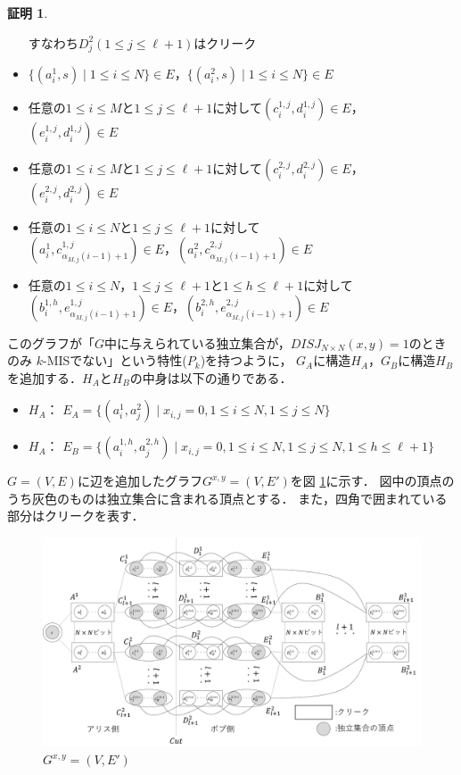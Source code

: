 \documentclass[12pt]{thesis}
\theoremstyle{definition}
\newtheorem*{prf*}{証明}
\begin{document}
\begin{prf*}
\begin{itemize}
すなわち$D^{2}_{j}(1\leq j \leq \ell+1)$はクリーク
\item $\{(a^{1}_{i}, s) \mid 1\leq i \leq N\} \in E$，$\{(a^{2}_{i}, s) \mid 1\leq i \leq N\} \in E$
\item 任意の$1\leq i \leq M$と$1\leq j \leq \ell+1$に対して$(c_{i}^{1, j}, d_{i}^{1, j}) \in E$，
$(e_{i}^{1, j}, d_{i}^{1, j}) \in E$
\item 任意の$1\leq i \leq M$と$1\leq j \leq \ell+1$に対して$(c_{i}^{2, j}, d_{i}^{2, j}) \in E$，
$(e_{i}^{2, j}, d_{i}^{2, j}) \in E$
\item 任意の$1\leq i \leq N$と$1\leq j \leq \ell+1$に対して \\
$\left(a^{1}_{i},c^{1,j}_{\alpha_{M,j}(i-1)+1}\right) \in E$，$\left(a^{2}_{i},c^{2,j}_{\alpha_{M,j}(i-1)+1}\right) \in E$
\item 任意の$1\leq i \leq N$，$1\leq j \leq \ell+1$と$1\leq h \leq \ell+1$に対して \\
$\left(b^{1,h}_{i},e^{1,j}_{\alpha_{M,j}(i-1)+1}\right) \in E$，$\left(b^{2,h}_{i},e^{2,j}_{\alpha_{M,j}(i-1)+1}\right) \in E$
\end{itemize}
このグラフが「$G$中に与えられている独立集合が，$DISJ_{N \times N} (x, y) = 1$のときのみ
$k$-MISでない」という特性($P_{k}$)を持つように，
$G_{A}$に構造$H_{A}$，$G_{B}$に構造$H_{B}$を追加する．$H_{A}$と$H_{B}$の中身は以下の通りである．
\begin{itemize}
\item $H_{A}$： $E_{A}=\{(a^{1}_{i},a^{2}_{j}) \mid x_{i,j}=0, 1 \leq i \leq N, 1 \leq j \leq N\}$
\item $H_{A}$： $E_{B}=\{(a^{1,h}_{i},a^{2,h}_{j}) \mid x_{i,j}=0, 1 \leq i \leq N, 1 \leq j \leq N, 1 \leq h \leq \ell+1\}$
\end{itemize}
$G = (V, E)$に辺を追加したグラフ$G^{x, y} = (V, E')$を図 \ref{k_Gxy}に示す．
図中の頂点のうち灰色のものは独立集合に含まれる頂点とする．
また，四角で囲まれている部分はクリークを表す．

\begin{figure}[ht]
\begin{center}
\includegraphics[width=120mm]{k_Gxy.png}
\end{center}
\caption{$G^{x, y} = (V, E')$}
\label{k_Gxy}
\end{figure}


\end{prf*}
\end{document}
